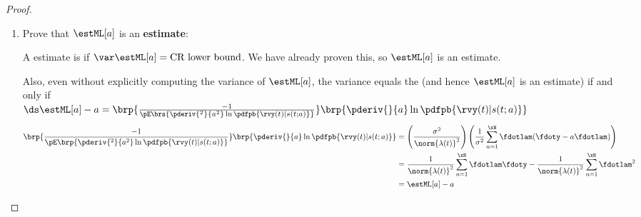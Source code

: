 \begin{proof}
\begin{enumerate}
\item Prove that $\estML[a]$ is an {\bf {} estimate}:

A estimate is  if
$\var\estML[a]=\mbox{CR lower bound}$.
We have already proven this, so $\estML[a]$ is an  estimate.

Also, even without explicitly computing the variance of $\estML[a]$,
the variance equals the 
(and hence $\estML[a]$ is an  estimate)
if and only if
\\\indentx$\ds\estML[a] -  a =
   \brp{\frac{-1}{\pE\brs{
              \pderiv{^2}{ a^2} \ln \pdfpb{\rvy(t)|s(t; a)}
           }}}
   \brp{\pderiv{}{ a} \ln \pdfpb{\rvy(t)|s(t; a)}}
  $
\begin{align*}
   \brp{\frac{-1}{\pE\brp{\pderiv{^2}{ a^2} \ln \pdfpb{\rvy(t)|s(t; a)}}}}
   \brp{\pderiv{}{ a} \ln \pdfpb{\rvy(t)|s(t; a)}}
     &= \left(\frac{\sigma^2}{\norm{\lambda(t)}^2}\right)
         \left(
           \frac{1}{\sigma^2} \sum_{n=1}^\xN \fdotlam( \fdoty - a \fdotlam)
         \right)
   \\&= \frac{1}{\norm{\lambda(t)}^2} \sum_{n=1}^\xN \fdotlam \fdoty -
         \frac{1}{\norm{\lambda(t)}^2} \sum_{n=1}^\xN \fdotlam^2
   \\&= \estML[a] - a
\end{align*}
\end{enumerate}
\end{proof}


